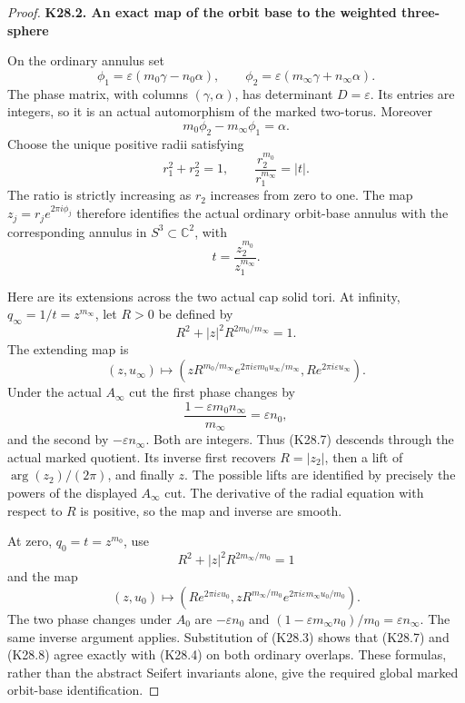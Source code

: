 \begin{proof}
\par

\medskip\noindent\textbf{K28.2. An exact map of the orbit base to the weighted three-sphere}

\par\nobreak

On the ordinary annulus set
\[
 \phi_1=\varepsilon(m_0\gamma-n_0\alpha),\qquad
 \phi_2=\varepsilon(m_\infty\gamma+n_\infty\alpha).
 \tag{K28.4}
\]
The phase matrix, with columns \((\gamma,\alpha)\), has determinant
\(D=\varepsilon\). Its entries are integers, so it is an actual
automorphism of the marked two-torus. Moreover
\[
 m_0\phi_2-m_\infty\phi_1=\alpha.
 \tag{K28.5}
\]
Choose the unique positive radii satisfying
\[
 r_1^2+r_2^2=1,\qquad
 \frac{r_2^{m_0}}{r_1^{m_\infty}}=|t|.
\]
The ratio is strictly increasing as \(r_2\) increases from zero to one.
The map \(z_j=r_j e^{2\pi i\phi_j}\) therefore identifies the actual
ordinary orbit-base annulus with the corresponding annulus in
\(S^3\subset\mathbb C^2\), with
\[
                         t=\frac{z_2^{m_0}}{z_1^{m_\infty}}.
 \tag{K28.6}
\]

Here are its extensions across the two actual cap solid tori. At infinity,
\(q_\infty=1/t=z^{m_\infty}\), let \(R>0\) be defined by
\[
 R^2+|z|^2R^{2m_0/m_\infty}=1.
\]
The extending map is
\[
 (z,u_\infty)\longmapsto
 \left(
 zR^{m_0/m_\infty}e^{2\pi i\varepsilon m_0u_\infty/m_\infty},
 Re^{2\pi i\varepsilon u_\infty}
 \right).
 \tag{K28.7}
\]
Under the actual \(A_\infty\) cut the first phase changes by
\[
 \frac{1-\varepsilon m_0n_\infty}{m_\infty}
       =\varepsilon n_0,
\]
and the second by \(-\varepsilon n_\infty\). Both are integers.
Thus (K28.7) descends through the actual marked quotient. Its inverse first
recovers \(R=|z_2|\), then a lift of \(\arg(z_2)/(2\pi)\), and finally
\(z\). The possible lifts are identified by precisely the powers of
the displayed \(A_\infty\) cut. The derivative of the radial equation
with respect to \(R\) is positive, so the map and inverse are smooth.

At zero, \(q_0=t=z^{m_0}\), use
\[
 R^2+|z|^2R^{2m_\infty/m_0}=1
\]
and the map
\[
 (z,u_0)\longmapsto
 \left(
 Re^{2\pi i\varepsilon u_0},
 zR^{m_\infty/m_0}e^{2\pi i\varepsilon m_\infty u_0/m_0}
 \right).
 \tag{K28.8}
\]
The two phase changes under \(A_0\) are
\(-\varepsilon n_0\) and
\((1-\varepsilon m_\infty n_0)/m_0=\varepsilon n_\infty\).
The same inverse argument applies. Substitution of (K28.3) shows that
(K28.7) and (K28.8) agree exactly with (K28.4) on both ordinary overlaps.
These formulas, rather than the abstract Seifert invariants alone,
give the required global marked orbit-base identification.


\end{proof}
